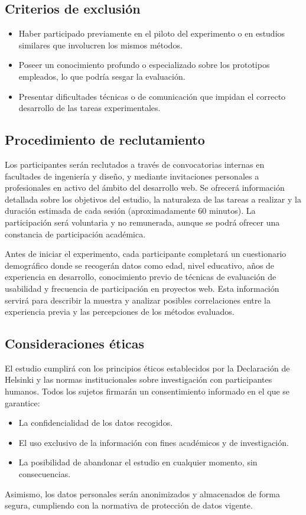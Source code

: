 \documentclass[a4paper,12pt]{report}
\begin{document}
\subsection*{Criterios de exclusión}
\begin{itemize}
    \item Haber participado previamente en el piloto del experimento o en estudios similares que involucren los mismos métodos.
    \item Poseer un conocimiento profundo o especializado sobre los prototipos empleados, lo que podría sesgar la evaluación.
    \item Presentar dificultades técnicas o de comunicación que impidan el correcto desarrollo de las tareas experimentales.
\end{itemize}

\subsection*{Procedimiento de reclutamiento}
Los participantes serán reclutados a través de convocatorias internas en facultades de ingeniería y diseño, y mediante invitaciones personales a profesionales en activo del ámbito del desarrollo web. Se ofrecerá información detallada sobre los objetivos del estudio, la naturaleza de las tareas a realizar y la duración estimada de cada sesión (aproximadamente 60 minutos). La participación será voluntaria y no remunerada, aunque se podrá ofrecer una constancia de participación académica.

Antes de iniciar el experimento, cada participante completará un cuestionario demográfico donde se recogerán datos como edad, nivel educativo, años de experiencia en desarrollo, conocimiento previo de técnicas de evaluación de usabilidad y frecuencia de participación en proyectos web. Esta información servirá para describir la muestra y analizar posibles correlaciones entre la experiencia previa y las percepciones de los métodos evaluados.

\subsection*{Consideraciones éticas}
El estudio cumplirá con los principios éticos establecidos por la Declaración de Helsinki y las normas institucionales sobre investigación con participantes humanos. Todos los sujetos firmarán un consentimiento informado en el que se garantice:
\begin{itemize}
    \item La confidencialidad de los datos recogidos.
    \item El uso exclusivo de la información con fines académicos y de investigación.
    \item La posibilidad de abandonar el estudio en cualquier momento, sin consecuencias.
\end{itemize}
Asimismo, los datos personales serán anonimizados y almacenados de forma segura, cumpliendo con la normativa de protección de datos vigente.
\end{document}
